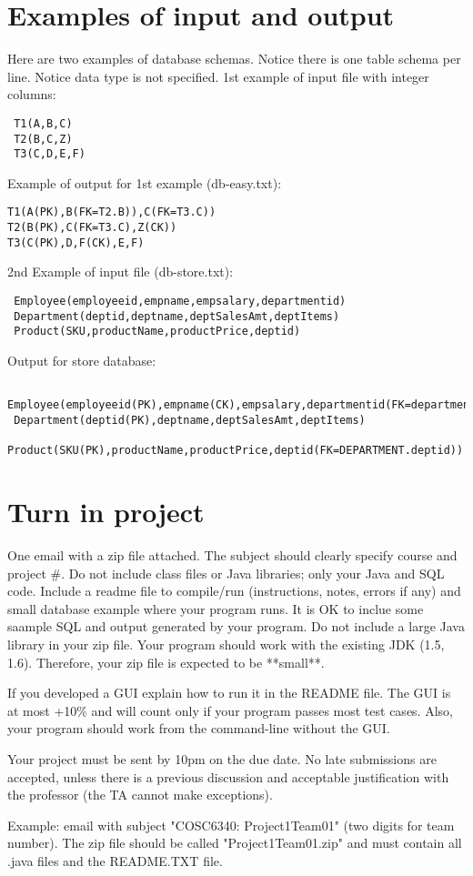 \section{Examples of input and output}


Here are two examples of database schemas. Notice there is one table schema per line.
Notice data type is not specified.
1st example of input file with integer columns:
\begin{verbatim}
 T1(A,B,C)
 T2(B,C,Z)
 T3(C,D,E,F)
\end{verbatim}


Example of output for 1st example (db-easy.txt):
\begin{verbatim}
T1(A(PK),B(FK=T2.B)),C(FK=T3.C))
T2(B(PK),C(FK=T3.C),Z(CK))
T3(C(PK),D,F(CK),E,F)
\end{verbatim}




2nd Example of input file (db-store.txt):
\begin{verbatim}
 Employee(employeeid,empname,empsalary,departmentid)
 Department(deptid,deptname,deptSalesAmt,deptItems)
 Product(SKU,productName,productPrice,deptid)
\end{verbatim}

Output for store database:
\begin{verbatim}
 Employee(employeeid(PK),empname(CK),empsalary,departmentid(FK=department.deptid)
 Department(deptid(PK),deptname,deptSalesAmt,deptItems)
 Product(SKU(PK),productName,productPrice,deptid(FK=DEPARTMENT.deptid))
\end{verbatim}


\section{Turn in project}

One email  with a zip file attached. The subject should clearly specify course and 
project \#.
Do not include class files or Java libraries; only your Java and SQL code.
Include a readme file to compile/run (instructions, notes, errors if any)
and small database example where your program runs.
It is OK to inclue some saample SQL and output generated by your program.
Do not include a large Java library in your zip file.
Your program should work with the existing JDK (1.5, 1.6).
Therefore, your zip file is expected to be **small**.

If you developed a GUI explain how to run it in the README file. The GUI is at most +10\%
and will count only if your program passes most test cases.
Also, your program should work from the command-line without the GUI.

Your project must be sent by 10pm on the due date.
No late submissions are accepted, unless there is a previous discussion 
and acceptable justification with the professor (the TA cannot make exceptions).

Example:
email with subject "COSC6340: Project1Team01" (two digits for team number). 
The zip file should be called "Project1Team01.zip" 
and must contain all .java files and the README.TXT file.




